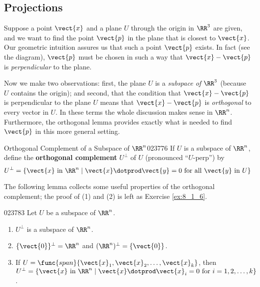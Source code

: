 \subsection*{Projections}

\begin{wrapfigure}{l}{5cm} 
\centering

\end{wrapfigure}

Suppose a point $\vect{x}$ and a plane $U$ through the origin in $\RR^3$ are given, and we want to find the point $\vect{p}$ in the plane that is closest to $\vect{x}$. Our geometric intuition assures us that such a point $\vect{p}$ exists. In fact (see the diagram), $\vect{p}$ must be chosen in such a way that $\vect{x} - \vect{p}$ is \textit{perpendicular} to the plane.

Now we make two observations: first, the plane $U$ is a \textit{subspace of} $\RR^3$ (because $U$ contains the origin); and second, that the condition that $\vect{x} - \vect{p}$ is perpendicular to the plane $U$ means that $\vect{x} - \vect{p}$ is \textit{orthogonal} to every vector in $U$. In these terms the whole discussion makes sense in $\RR^n$. Furthermore, the orthogonal lemma provides exactly what is needed to find $\vect{p}$ in this more general setting.

\begin{definition}{Orthogonal Complement of a Subspace of $\RR^n$}{023776}
If $U$ is a subspace of $\RR^n$, define the \textbf{orthogonal complement} $U^\perp$ of $U$ (pronounced ``$U$-perp'') by
\begin{equation*}
U^\perp = \{\vect{x} \mbox{ in } \RR^n \mid \vect{x} \dotprod \vect{y} = 0 \mbox{ for all } \vect{y} \mbox{ in } U\}
\end{equation*}
\end{definition}

The following lemma collects some 
useful properties of the orthogonal complement; the proof of (1) and (2)
 is left as Exercise \ref{ex:8_1_6}.


\begin{lemma}{}{023783}
Let $U$ be a subspace of $\RR^n$.
\begin{enumerate}
\item $U^\perp$ is a subspace of $\RR^n$.

\item $\{\vect{0}\}^\perp = \RR^n$ and $(\RR^n)^\perp = \{\vect{0}\}$.

\item If $U = \func{span}\{\vect{x}_{1}, \vect{x}_{2}, \dots, \vect{x}_{k}\}$, then $U^\perp = \{\vect{x} \mbox{ in } \RR^n \mid \vect{x} \dotprod \vect{x}_{i} = 0 \mbox{ for } i = 1, 2, \dots, k\}$.

\end{enumerate}
\end{lemma}


